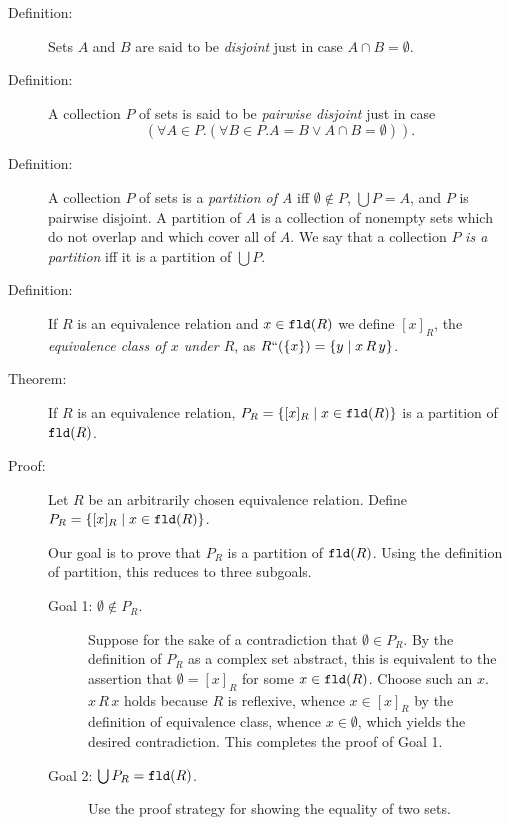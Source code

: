 \documentclass[12pt]{book}
\begin{document}
\begin{description}

\item[Definition:]  Sets $A$ and $B$ are said to be {\em disjoint\/} just in case $A \cap
B = \emptyset$.

\item[Definition:]A collection $P$ of sets is said to be {\em pairwise disjoint\/} just
in case $$(\forall A \in P.(\forall B \in P.A=B \vee A \cap B = \emptyset)).$$

\item[Definition:]  A collection $P$ of sets is a {\em partition of A\/} iff $\emptyset
\not\in P$, $\bigcup P = A$, and $P$ is pairwise disjoint.  A
partition of $A$ is a collection of nonempty sets which do not overlap
and which cover all of $A$.  We say that a collection $P$ {\em is a
partition\/} iff it is a partition of $\bigcup P$.

\item[Definition:]  If $R$ is an equivalence relation and $x \in {\tt fld}(R)$ we define $[x]_R$,
the {\em equivalence class of $x$ under $R$\/}, as $R``(\{x\}) = \{y \mid x \,R\,y\}$.

\item[Theorem:] If $R$ is an equivalence relation, $P_R= \{[x]_R \mid
x \in {\tt fld}(R)\}$ is a partition of ${\tt fld}(R)$.

\item[Proof:]  Let $R$ be an arbitrarily chosen equivalence relation.
Define $P_R= \{[x]_R \mid x \in {\tt fld}(R)\}$.

Our goal is to prove that $P_R$ is a partition of ${\tt fld}(R)$.
Using the definition of partition, this reduces to three subgoals.

\begin{description}

\item[Goal 1: $\emptyset \not\in P_R$.] Suppose for the sake of a
contradiction that $\emptyset \in P_R$.  By the definition of $P_R$ as
a complex set abstract, this is equivalent to the assertion that
$\emptyset = [x]_R$ for some $x \in {\tt fld}(R)$.  Choose such an
$x$.  $x\,R\,x$ holds because $R$ is reflexive, whence $x \in [x]_R$
by the definition of equivalence class, whence $x \in \emptyset$,
which yields the desired contradiction.  This completes the proof of
Goal 1.

\item[Goal 2: $\bigcup P_R = {\tt fld}(R)$.]  Use the proof strategy for
showing the equality of two sets.  


\end{description}
\end{description}
\end{document}
